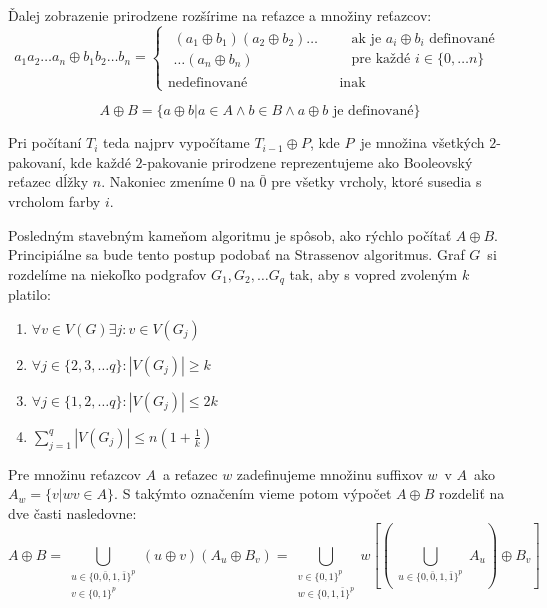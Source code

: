 Ďalej zobrazenie prirodzene rozšírime na reťazce a množiny reťazcov:
\begin{equation}
    a_1 a_2 \ldots a_n \oplus b_1 b_2 \ldots b_n =
      \begin{cases}
          \begin{gathered}
            (a_1 \oplus b_1)(a_2 \oplus b_2) \ldots \\
            \ldots (a_n \oplus b_n)  
          \end{gathered} &
          \begin{aligned}
            & \textrm{ak je } a_i \oplus b_i \textrm{ definované} \\ 
            & \textrm{pre každé } i \in \{0, \ldots n\} 
          \end{aligned} \\
        \textrm{nedefinované} & \textrm{ inak}
      \end{cases}
\end{equation}

$$A \oplus B = \{ a \oplus b | a \in A \wedge b \in B \wedge a \oplus b \textrm{ je definované} \} $$

Pri počítaní $T_i$ teda najprv vypočítame $T_{i-1} \oplus P$, kde $P$ je množina všetkých $2$-pakovaní, kde
každé $2$-pakovanie prirodzene reprezentujeme ako Booleovský reťazec dĺžky $n$. Nakoniec zmeníme $0$ na $\bar{0}$ pre
všetky vrcholy, ktoré susedia s vrcholom farby $i$.

Posledným stavebným kameňom algoritmu je spôsob, ako rýchlo počítať $A \oplus B$. Principiálne
sa bude tento postup podobať na Strassenov algoritmus. Graf $G$ si rozdelíme na niekoľko podgrafov
$G_1, G_2, \ldots G_q$ tak, aby s vopred zvoleným $k$ platilo:

\begin{enumerate}
    \item $\forall v \in V(G) \exists j : v \in V(G_j)$
    \item $\forall j \in \{2, 3, \ldots q \} : |V(G_j)| \ge k$
    \item $\forall j \in \{ 1, 2, \ldots q \} : |V(G_j)| \leq 2k$
    \item $\sum_{j=1}^q |V(G_j)| \leq n(1 + \frac{1}{k})$
\end{enumerate}

Pre množinu reťazcov $A$ a reťazec $w$ zadefinujeme množinu suffixov $w$ v $A$ ako $A_w = \{v | wv \in A\}$.
S takýmto označením vieme potom výpočet $A \oplus B$ rozdeliť na dve časti nasledovne:
$$A \oplus B = \bigcup_{\substack{u \in \{0, \bar{0}, 1, \bar{1}\}^p \\ v \in \{0, 1\}^p \\ [u \oplus v \textrm{ je definované}]} }
(u \oplus v)(A_u \oplus B_v) = \bigcup_{\substack{v \in \{0, 1\}^p \\ w \in \{0, 1, \bar{1}\}^p}}
w \left[ \left( \bigcup_{\substack{u \in \{0, \bar{0}, 1, \bar{1}\}^p \\ [u \oplus v = w] }} A_u \right) \oplus B_v \right]$$

